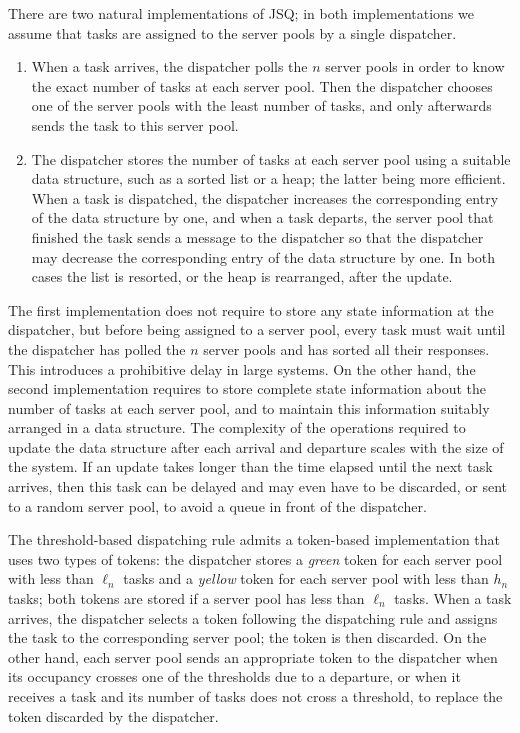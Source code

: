 \documentclass[a4paper, 12pt]{article}
\theoremstyle{definition}
\begin{document}
There are two natural implementations of JSQ; in both implementations we assume that tasks are assigned to the server pools by a single dispatcher.
\begin{enumerate}
	\item[(a)] When a task arrives, the dispatcher polls the $n$ server pools in order to know the exact number of tasks at each server pool. Then the dispatcher chooses one of the server pools with the least number of tasks, and only afterwards sends the task to this server pool.
	
	\item[(b)] The dispatcher stores the number of tasks at each server pool using a suitable data structure, such as a sorted list or a heap; the latter being more efficient. When a task is dispatched, the dispatcher increases the corresponding entry of the data structure by one, and when a task departs, the server pool that finished the task sends a message to the dispatcher so that the dispatcher may decrease the corresponding entry of the data structure by one. In both cases the list is resorted, or the heap is rearranged, after the update.
\end{enumerate}

The first implementation does not require to store any state information at the dispatcher, but before being assigned to a server pool, every task must wait until the dispatcher has polled the $n$ server pools and has sorted all their responses. This introduces a prohibitive delay in large systems. On the other hand, the second implementation requires to store complete state information about the number of tasks at each server pool, and to maintain this information suitably arranged in a data structure. The complexity of the operations required to update the data structure after each arrival and departure scales with the size of the system. If an update takes longer than the time elapsed until the next task arrives, then this task can be delayed and may even have to be discarded, or sent to a random server pool, to avoid a queue in front of the dispatcher.

The threshold-based dispatching rule admits a token-based implementation that uses two types of tokens: the dispatcher stores a \emph{green} token for each server pool with less than $\ell_n$ tasks and a \emph{yellow} token for each server pool with less than $h_n$ tasks; both tokens are stored if a server pool has less than $\ell_n$ tasks. When a task arrives, the dispatcher selects a token following the dispatching rule and assigns the task to the corresponding server pool; the token is then discarded. On the other hand, each server pool sends an appropriate token to the dispatcher when its occupancy crosses one of the thresholds due to a departure, or when it receives a task and its number of tasks does not cross a threshold, to replace the token discarded by the dispatcher.
\end{document}
